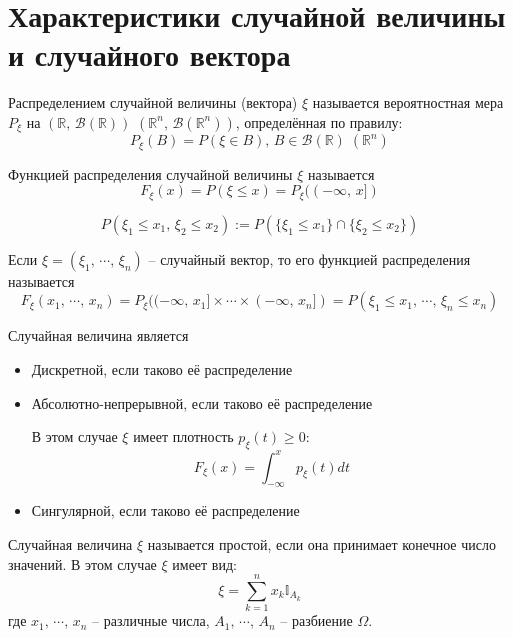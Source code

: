 \section{Характеристики случайной величины и случайного вектора}
\begin{definition}
	Распределением случайной величины (вектора) $\xi$ называется вероятностная мера $P_\xi$ на $(\mathbb{R},\,\mathcal{B}(\mathbb{R}))$ $(\mathbb{R}^n,\,\mathcal{B}(\mathbb{R}^n))$, определённая по правилу:
	\[P_\xi(B) = P(\xi \in B),\, B \in \mathcal{B}(\mathbb{R}) \; (\mathbb{R}^n)\]
\end{definition}

\begin{definition}
	Функцией распределения случайной величины $\xi$ называется
	\[F_\xi(x) = P(\xi \leq x) = P_\xi((-\infty,\, x])\]
\end{definition}

\begin{note}
	\[P(\xi_1 \leq x_1,\, \xi_2 \leq x_2) := P(\{\xi_1 \leq x_1\} \cap \{\xi_2 \leq x_2\})\]
\end{note}

\begin{definition}
	Если $\xi = (\xi_1,\,\cdots,\,\xi_n)$ -- случайный вектор, то его функцией распределения называется
	\[F_\xi(x_1,\,\cdots,\,x_n) = P_\xi((-\infty,\,x_1]\times\cdots\times (-\infty,\,x_n]) = P(\xi_1 \leq x_1,\, \cdots,\, \xi_n \leq x_n)\]
\end{definition}

\begin{definition}
	Случайная величина является
	\begin{itemize}
		\item Дискретной, если таково её распределение
		\item Абсолютно-непрерывной, если таково её распределение

		      В этом случае $\xi$ имеет плотность $p_\xi(t) \geq 0$:
		      \[F_\xi(x) = \int_{-\infty}^x p_\xi(t)dt\]
		\item Сингулярной, если таково её распределение
	\end{itemize}
\end{definition}

\begin{definition}
	Случайная величина $\xi$ называется простой, если она принимает конечное число значений. В этом случае $\xi$ имеет вид:
	\[\xi = \sum_{k = 1}^n x_k \mathbb{I}_{A_k}\]
	где $x_1,\,\cdots,\,x_n$ -- различные числа, $A_1,\,\cdots,\,A_n$ -- разбиение $\Omega$.
\end{definition}

